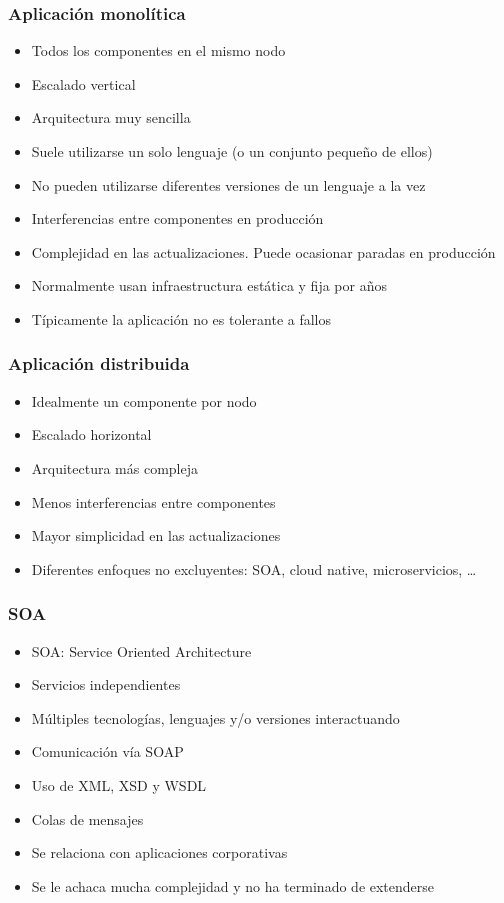 \documentclass[aspectratio=169]{beamer}
\begin{document}
\begin{frame}
  \frametitle{Aplicación monolítica}
  \begin{itemize}
  \item Todos los componentes en el mismo nodo
  \item Escalado vertical
  \item Arquitectura muy sencilla
  \item Suele utilizarse un solo lenguaje (o un conjunto pequeño de ellos)
  \item No pueden utilizarse diferentes versiones de un lenguaje a la vez
  \item Interferencias entre componentes en producción
  \item Complejidad en las actualizaciones. Puede ocasionar paradas en producción
  \item Normalmente usan infraestructura estática y fija por años
  \item Típicamente la aplicación no es tolerante a fallos
  \end{itemize}
\end{frame}

\begin{frame}
  \frametitle{Aplicación distribuida}
  \begin{itemize}
  \item Idealmente un componente por nodo
  \item Escalado horizontal
  \item Arquitectura más compleja
  \item Menos interferencias entre componentes
  \item Mayor simplicidad en las actualizaciones
  \item Diferentes enfoques no excluyentes: SOA, cloud native, microservicios, \ldots
  \end{itemize}
\end{frame}

\begin{frame}
  \frametitle{SOA}
  \begin{itemize}
  \item SOA: Service Oriented Architecture
  \item Servicios independientes
  \item Múltiples tecnologías, lenguajes y/o versiones interactuando
  \item Comunicación vía SOAP
  \item Uso de XML, XSD y WSDL
  \item Colas de mensajes
  \item Se relaciona con aplicaciones corporativas
  \item Se le achaca mucha complejidad y no ha terminado de extenderse
  \end{itemize}
\end{frame}
\end{document}
